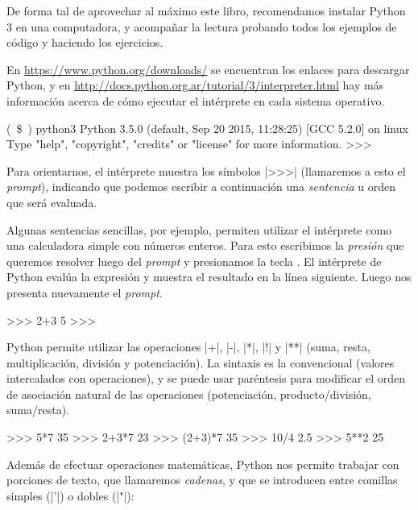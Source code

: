 \begin{atencion}
De forma tal de aprovechar al máximo este libro, recomendamos instalar Python 3
en una computadora, y acompañar la lectura probando todos los ejemplos de
código y haciendo los ejercicios.

En \url{https://www.python.org/downloads/} se encuentran los enlaces para
descargar Python, y en
\url{http://docs.python.org.ar/tutorial/3/interpreter.html} hay más información
acerca de cómo ejecutar el intérprete en cada sistema operativo.
\end{atencion}

\begin{codigo-nohl-sn}
(~\$~) python3
Python 3.5.0 (default, Sep 20 2015, 11:28:25)
[GCC 5.2.0] on linux
Type "help", "copyright", "credits" or "license" for more information.
>>>
\end{codigo-nohl-sn}

Para orientarnos, el intérprete muestra los símbolos |>>>| (llamaremos a esto
el \emph{prompt}), indicando que podemos escribir a continuación una
\emph{sentencia} u orden que será evaluada.

Algunas sentencias sencillas, por ejemplo, permiten utilizar el intérprete como
una calculadora simple con números enteros. Para esto escribimos la 
\emph{presión} que queremos resolver luego del \emph{prompt} y presionamos la tecla
. El intérprete de Python evalúa la expresión y muestra el
resultado en la línea siguiente. Luego nos presenta nuevamente el \emph{prompt}.

\begin{codigo-python-sn}
>>> 2+3
5
>>>
\end{codigo-python-sn}

Python permite utilizar las operaciones |+|, |-|, |*|, |!| y |**|
(suma, resta, multiplicación, división y potenciación). La sintaxis es la
convencional (valores intercalados con operaciones), y se puede usar
paréntesis para modificar el orden de asociación natural de las operaciones
(potenciación, producto/división, suma/resta).

\begin{codigo-python-sn}
>>> 5*7
35
>>> 2+3*7
23
>>> (2+3)*7
35
>>> 10/4
2.5
>>> 5**2
25
\end{codigo-python-sn}

Además de efectuar operaciones matemáticas, Python nos permite trabajar con
porciones de texto, que llamaremos \emph{cadenas}, y que se introducen entre
comillas simples (|'|) o dobles (|"|):

